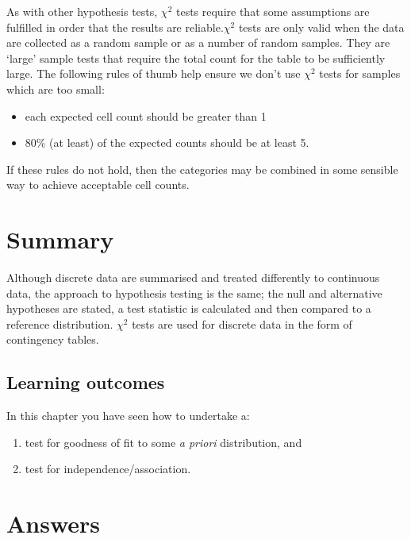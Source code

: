 \documentclass[
  oneside]{krantz}
\providecommand{\tightlist}{%
  \setlength{\itemsep}{0pt}\setlength{\parskip}{0pt}}
\begin{document}
As with other hypothesis tests, \(\chi^2\) tests require that some assumptions are fulfilled in order that the results are reliable.\(\chi^2\) tests are only valid when the data are collected as a random sample or as a number of random samples. They are `large' sample tests that require the total count for the table to be sufficiently large. The following rules of thumb help ensure we don't use \(\chi^2\) tests for samples which are too small:

\begin{itemize}
\tightlist
\item
  each expected cell count should be greater than 1
\item
  80\% (at least) of the expected counts should be at least 5.
\end{itemize}

If these rules do not hold, then the categories may be combined in some sensible way to achieve acceptable cell counts.

\hypertarget{summary}{%
\section{Summary}\label{summary}}

Although discrete data are summarised and treated differently to continuous data, the approach to hypothesis testing is the same; the null and alternative hypotheses are stated, a test statistic is calculated and then compared to a reference distribution. \(\chi^2\) tests are used for discrete data in the form of contingency tables.

\hypertarget{learning-outcomes-8}{%
\subsection{Learning outcomes}\label{learning-outcomes-8}}

In this chapter you have seen how to undertake a:

\begin{enumerate}
\def\labelenumi{\arabic{enumi}.}
\item
  test for goodness of fit to some \textit{a priori} distribution, and
\item
  test for independence/association.
\end{enumerate}

\hypertarget{answers}{%
\section{Answers}\label{answers}}
\end{document}
